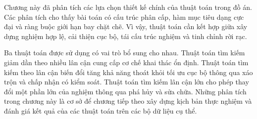 Chương này đã phân tích các lựa chọn thiết kế chính của thuật toán trong đồ án. Các phân tích cho thấy bài toán có cấu trúc phân cấp, hàm mục tiêu dạng cực đại và ràng buộc giới hạn bay chặt chẽ. Vì vậy, thuật toán cần kết hợp giữa xây dựng nghiệm hợp lệ, cải thiện cục bộ, tái cấu trúc nghiệm và tinh chỉnh rời rạc.

Ba thuật toán được sử dụng có vai trò bổ sung cho nhau. Thuật toán tìm kiếm giảm dần theo nhiều lân cận cung cấp cơ chế khai thác ổn định. Thuật toán tìm kiếm theo lân cận biến đổi tăng khả năng thoát khỏi tối ưu cục bộ thông qua xáo trộn và chấp nhận có kiểm soát. Thuật toán tìm kiếm lân cận lớn cho phép thay đổi một phần lớn của nghiệm thông qua phá hủy và sửa chữa. Những phân tích trong chương này là cơ sở để chương tiếp theo xây dựng kịch bản thực nghiệm và đánh giá kết quả của các thuật toán trên các bộ dữ liệu cụ thể.
